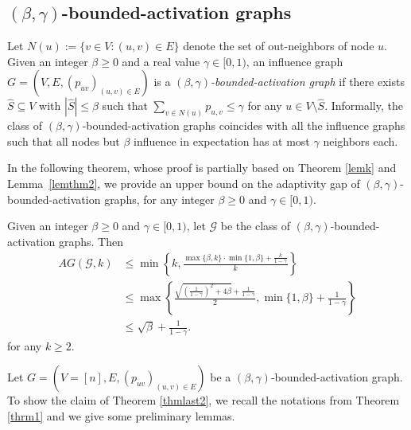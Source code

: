 \subsection{$(\beta,\gamma)$-bounded-activation graphs} \label{sec:beta}
Let $N(u):=\{v\in V:(u,v)\in E\}$ denote the set of out-neighbors of node $u$. Given an integer $\beta\geq 0$ and a real value $\gamma\in [0,1)$, an influence graph $G=(V,E,(p_{uv})_{(u,v)\in E})$ is a {\em $(\beta,\gamma)$-bounded-activation graph} if there exists $\hat{S}\subseteq V$ with $|\hat{S}|\leq \beta$ such that $\sum_{v\in N(u)}p_{u,v}\leq \gamma$ for any $u\in V\setminus \hat{S}$. Informally, the class of $(\beta,\gamma)$-bounded-activation graphs coincides with all the influence graphs such that all nodes but $\beta$ influence in expectation has at most $\gamma$ neighbors each.

In the following theorem, whose proof is partially based on Theorem \ref{lemk} and Lemma~\ref{lemthm2}, we provide an upper bound on the adaptivity gap of $(\beta,\gamma)$-bounded-activation graphs, for any integer $\beta\geq 0$ and $\gamma\in [0,1)$.
\begin{theorem}\label{thmlast2}
Given an integer $\beta\geq 0$ and $\gamma\in [0,1)$, let $\mathcal{G}$ be the class of $(\beta,\gamma)$-bounded-activation graphs. Then 
\begin{align}
AG(\mathcal{G},k)&\leq \min\left\{k,\frac{\max\{\beta,k\}\cdot \min\{1,\beta\}+\frac{k}{1-\gamma}}{k}\right\}\label{beta1}\\
&\leq \max\left\{\frac{\sqrt{\left(\frac{1}{1-\gamma}\right)^2+4\beta}+\frac{1}{1-\gamma}}{2},\min\{1,\beta\}+\frac{1}{1-\gamma}\right\}\nonumber\\
&\leq \sqrt{\beta}+\frac{1}{1-\gamma}.\nonumber
\end{align}
for any $k\geq 2$.
\end{theorem}
Let $G=(V=[n],E,(p_{uv})_{(u,v)\in E})$ be a $(\beta,\gamma)$-bounded-activation graph. To show the claim of Theorem \ref{thmlast2}, we recall the notations from Theorem \ref{thrm1} and we give some preliminary lemmas. 

